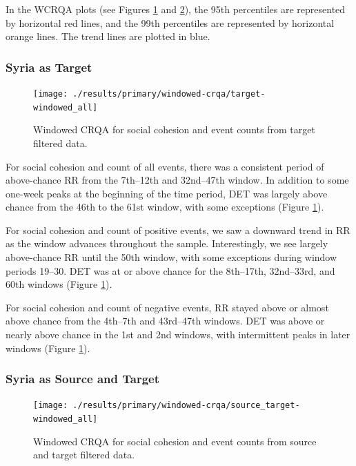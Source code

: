 \documentclass[
  english,
  man]{apa6}
\begin{document}
In the WCRQA plots (see Figures \ref{fig:plot-wcrqa-targ-all} and
\ref{fig:plot-wcrqa-source-targ-all}), the 95th percentiles are represented by
horizontal red lines, and the 99th percentiles are represented by horizontal
orange lines. The trend lines are plotted in blue.

\hypertarget{syria-as-target-1}{%
\subsubsection{Syria as Target}\label{syria-as-target-1}}

\begin{figure}
\texttt{[image: ./results/primary/windowed-crqa/target-windowed\_all]} \caption{Windowed CRQA for social cohesion and event counts from target filtered data.}\label{fig:plot-wcrqa-targ-all}
\end{figure}

For social cohesion and count of all events, there was a consistent period of
above-chance RR from the 7th--12th and 32nd--47th window. In addition to some
one-week peaks at the beginning of the time period, DET was largely above chance
from the 46th to the 61st window, with some exceptions (Figure
\ref{fig:plot-wcrqa-targ-all}).

For social cohesion and count of positive events, we saw a downward trend in RR
as the window advances throughout the sample. Interestingly, we see largely
above-chance RR until the 50th window, with some exceptions during window
periods 19--30. DET was at or above chance for the 8th--17th, 32nd--33rd, and
60th windows (Figure \ref{fig:plot-wcrqa-targ-all}).

For social cohesion and count of negative events, RR stayed above or almost
above chance from the 4th--7th and 43rd--47th windows. DET was above or nearly
above chance in the 1st and 2nd windows, with intermittent peaks in later
windows (Figure \ref{fig:plot-wcrqa-targ-all}).

\hypertarget{syria-as-source-and-target-1}{%
\subsubsection{Syria as Source and Target}\label{syria-as-source-and-target-1}}

\begin{figure}
\texttt{[image: ./results/primary/windowed-crqa/source\_target-windowed\_all]} \caption{Windowed CRQA for social cohesion and event counts from source and target filtered data.}\label{fig:plot-wcrqa-source-targ-all}
\end{figure}
\end{document}
